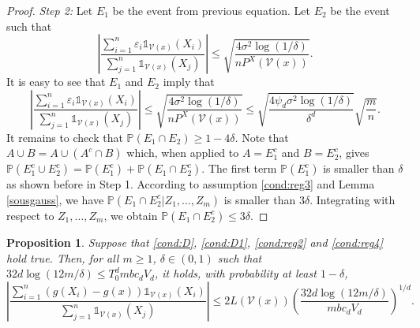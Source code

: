 \documentclass[paper=a4, fontsize=11pt]{scrartcl}
\newcommand{\ind}{\mathds{1}}
\newtheorem{proposition}[theorem]{Proposition}
\begin{document}
\begin{proof}
\noindent \textit{Step 2:} Let $E_1$ be the event from previous equation.  Let $E_2 $ be the event such that
$$\left| \dfrac{\sum_{i=1}^n \varepsilon_i \ind _{ \mathcal V(x) }(X_i)}{{\sum_{j=1}^n \ind _{ \mathcal V(x) }(X_j)}}  \right| \leq \sqrt{\dfrac{4 \sigma^2 \log(1/\delta)}{n P^X(\mathcal{V}(x))} } .$$
It is easy to see that $E_1$ and $E_2 $ imply that 
\[
\left| \dfrac{\sum_{i=1}^n \varepsilon_i \ind _{ \mathcal V(x) }(X_i)}{{\sum_{j=1}^n \ind _{ \mathcal V(x) }(X_j)}}  \right| \leq \sqrt{\dfrac{4\sigma^2 \log(1/\delta)}{n P^X(\mathcal{V}(x))}} \leq \sqrt{\dfrac{4\psi_d \sigma^2 \log(1/\delta)}{\delta^d}} \sqrt{\dfrac{m}{n}}.
\]
It remains to check that $\mathbb P ( E_1\cap E_2) \geq 1-4\delta$. Note that 
$A\cup B = A \cup  (A^c\cap B)  $
which, when applied to $ A = E_1^c$ and $B = E_2^c $, gives $\mathbb P ( E_1^c\cup E_2^c) = \mathbb P (  E_1^c) + \mathbb P ( E_1\cap E_2^c)   $. The first term $ \mathbb P (  E_1^c)$ is smaller than $\delta$ as shown before in Step 1.
 According to assumption \ref{cond:reg3} and Lemma \ref{sousgauss}, we have $\mathbb P ( E_1\cap E_2^c | Z_{1}, \dots, Z_m) $ is smaller than $3\delta$. Integrating with respect to $Z_{1} , \ldots, Z_{m}$, we obtain $\mathbb P ( E_1\cap E_2^c )\leq 3\delta $. 
\end{proof}



\begin{proposition}
Suppose that \ref{cond:D}, \ref{cond:D1}, \ref{cond:reg2} and \ref{cond:reg4} hold true. Then, for all $m\geq 1$, $\delta \in (0,1)$ such that $ 32 d \log(12m / \delta )  \leq T_0^d  m b c_d V_d $, it holds, with probability at least $1-\delta$,
$$ \left|  \dfrac{\sum_{i=1}^n \left(g(X_i) - g(x)\right) \ind_{ \mathcal V(x) }(X_i)}{\sum_{j=1}^n \ind_{ \mathcal V(x) }(X_j)} \right| \leq  2 L(\mathcal{V}(x))  \left(\frac{ 32d \log(12m/\delta) }{ mb c_d V_d }  \right)^{1/d} .$$
\end{proposition}
\end{document}
